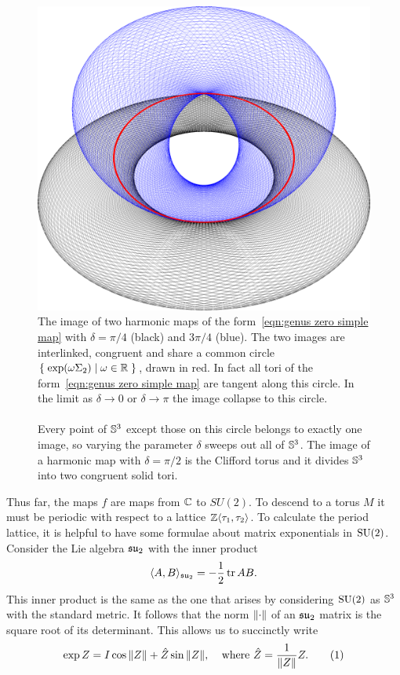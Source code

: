\documentclass{article}
\begin{document}
\begin{figure}
\includegraphics[width=\textwidth]{graphics/genus0_linked.png}
\caption{The image of two harmonic maps of the form~\eqref{eqn:genus zero simple map} with $\delta=\pi/4$ (black) and $3\pi/4$ (blue). The two images are interlinked, congruent and share a common circle $\Set{\exp(\omega \Sigma_2)}{\omega \in \R}$, drawn in red. In fact all tori of the form~\eqref{eqn:genus zero simple map} are tangent along this circle. In the limit as $\delta \to 0$ or $\delta \to \pi$ the image collapse to this circle. \\
~\\
Every point of $\S^3$ except those on this circle belongs to exactly one image, so varying the parameter $\delta$ sweeps out all of $\S^3$.
The image of a harmonic map with $\delta=\pi/2$ is the Clifford torus and it divides $\S^3$ into two congruent solid tori.\label{fig:genus0 linked}}
\end{figure}



Thus far, the maps $f$ are maps from $\C$ to $SU(2)$. To descend to a torus $M$ it must be periodic with respect to a lattice $\Z\langle \tau_1,\tau_2\rangle$. To calculate the period lattice, it is helpful to have some formulae about matrix exponentials in $\SU(2)$. Consider the Lie algebra $\su_2$ with the inner product
\[
\langle A, B \rangle_{\su_2} = -\frac{1}{2}\tr AB.
\]
This inner product is the same as the one that arises by considering $\SU(2)$ as $\S^3$ with the standard metric. It follows that the norm $\norm{\cdot}$ of an $\su_2$ matrix is the square root of its determinant. This allows us to succinctly write 
\[
    \exp Z = I \cos \norm{Z} + \hat{Z} \sin \norm{Z},
    \;\;\;\;
    \text{where }\hat{Z} = \frac{1}{\norm{Z}} Z.
\labelthis{eqn:exp formula}
\]
\end{document}
